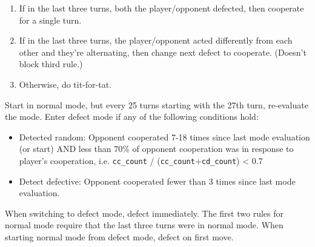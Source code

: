 \documentclass{article}
\begin{document}
    \begin{enumerate}
        \item If in the last three turns, both the player/opponent defected, then
            cooperate for a single turn.
        \item If in the last three turns, the player/opponent acted differently from
            each other and they're alternating, then change next defect to
            cooperate.  (Doesn't block third rule.)
        \item Otherwise, do tit-for-tat.
    \end{enumerate}

Start in normal mode, but every 25 turns starting with the 27th turn,
re-evaluate the mode.  Enter defect mode if any of the following
conditions hold:

    \begin{itemize}
        \item Detected random:  Opponent cooperated 7-18 times since last mode
evaluation (or start) AND less than 70\% of opponent cooperation was in
response to player's cooperation, i.e.
    \texttt{cc\_count} / (\texttt{cc\_count}+\texttt{cd\_count}) < 0.7
\item Detect defective:  Opponent cooperated fewer than 3 times since last mode
evaluation.
    \end{itemize}

When switching to defect mode, defect immediately. The first two rules for
normal mode require that the last three turns were in normal mode.  When starting
normal mode from defect mode, defect on first move.
\end{document}
